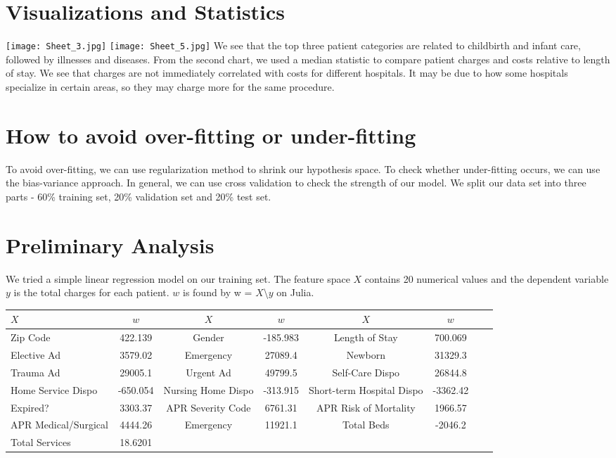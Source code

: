 \documentclass[letterpaper,11pt]{article}
\begin{document}
\section*{Visualizations and Statistics}

\texttt{[image: Sheet\_3.jpg]}
\texttt{[image: Sheet\_5.jpg]}
We see that the top three patient categories are related to childbirth and infant care, followed by illnesses and diseases. From the second chart, we used a median statistic to compare patient charges and costs relative to length of stay. We see that charges are not immediately correlated with costs for different hospitals. It may be due to how some hospitals specialize in certain areas, so they may charge more for the same procedure. 

\section*{How to avoid over-fitting or under-fitting}

To avoid over-fitting, we can use regularization method to shrink our hypothesis space. To check whether under-fitting occurs, we can use the bias-variance approach. 
\medskip
In general, we can use cross validation to check the strength of our model. We split our data set into three parts - 60\% training set, 20\% validation set and 20\% test set.

\section*{Preliminary Analysis}

We tried a simple linear regression model on our training set. The feature space $X$ contains 20 numerical values and the dependent variable $y$ is the total charges for each patient. $w$ is found by w = $X$\textbackslash $y$ on Julia.

\begin{tabular}{l*{6}{c}r}

$X$ & $w$ & $X$ & $w$ & $X$ & $w$ \\
\hline
Zip Code & 422.139 & Gender & -185.983 & Length of Stay & 700.069\\ 
Elective Ad & 3579.02 & Emergency & 27089.4 & Newborn &31329.3  \\
Trauma Ad & 29005.1 & Urgent Ad & 49799.5 & Self-Care Dispo & 26844.8 \\
Home Service Dispo & -650.054 & Nursing Home Dispo & -313.915 & Short-term Hospital Dispo & -3362.42\\
Expired? & 3303.37 & APR Severity Code & 6761.31 & APR Risk of Mortality & 1966.57 \\ 
APR Medical/Surgical & 4444.26 & Emergency & 11921.1 & Total Beds & -2046.2 \\ 
Total Services & 18.6201 \\


\end{tabular}
\end{document}
